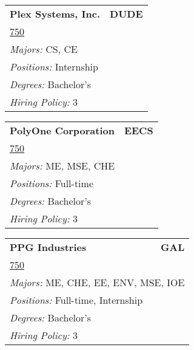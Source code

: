 \documentclass[twoside]{article}
\begin{document}
\begin{center}
\begin{multicols}{3}
\begin{FlushLeft}
\begin{minipage}{\columnwidth}
\end{minipage}
 
\begin{minipage}{\columnwidth}\begin{tabularx}{.95\columnwidth}{Xr}
                 {\Large\bf Plex Systems, Inc.} & {\Large\bf DUDE}\\
    \multicolumn{2}{p{.95\columnwidth}}{\url{750}}\\
    \multicolumn{2}{p{.95\columnwidth}}{\emph{Majors:} CS, CE}\\
    \multicolumn{2}{p{.95\columnwidth}}{\emph{Positions:} Internship}\\
    \multicolumn{2}{p{.95\columnwidth}}{\emph{Degrees:} Bachelor's}\\
    \multicolumn{2}{p{.95\columnwidth}}{\emph{Hiring Policy:} 3}\\
    \end{tabularx}
    
\end{minipage}
 
\begin{minipage}{\columnwidth}\begin{tabularx}{.95\columnwidth}{Xr}
                 {\Large\bf PolyOne Corporation} & {\Large\bf EECS}\\
    \multicolumn{2}{p{.95\columnwidth}}{\url{750}}\\
    \multicolumn{2}{p{.95\columnwidth}}{\emph{Majors:} ME, MSE, CHE}\\
    \multicolumn{2}{p{.95\columnwidth}}{\emph{Positions:} Full-time}\\
    \multicolumn{2}{p{.95\columnwidth}}{\emph{Degrees:} Bachelor's}\\
    \multicolumn{2}{p{.95\columnwidth}}{\emph{Hiring Policy:} 3}\\
    \end{tabularx}
    
\end{minipage}
 
\begin{minipage}{\columnwidth}\begin{tabularx}{.95\columnwidth}{Xr}
                 {\Large\bf PPG Industries} & {\Large\bf GAL}\\
    \multicolumn{2}{p{.95\columnwidth}}{\url{750}}\\
    \multicolumn{2}{p{.95\columnwidth}}{\emph{Majors:} ME, CHE, EE, ENV, MSE, IOE}\\
    \multicolumn{2}{p{.95\columnwidth}}{\emph{Positions:} Full-time, Internship}\\
    \multicolumn{2}{p{.95\columnwidth}}{\emph{Degrees:} Bachelor's}\\
    \multicolumn{2}{p{.95\columnwidth}}{\emph{Hiring Policy:} 3}\\
    \end{tabularx}
    

\end{minipage}
\end{FlushLeft}
\end{multicols}
\end{center}
\end{document}
